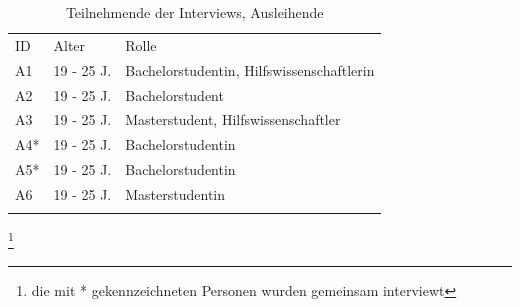 \begin{table}[h]
        \centering
        \caption{Teilnehmende der Interviews, Ausleihende}
        \begin{tabular}{lll}
                \arrayrulecolor{maincolor}\hline
                \sffamily\color{maincolor}ID & \sffamily\color{maincolor}Alter &
                \sffamily\color{maincolor}Rolle
                \\
                \arrayrulecolor{maincolor}\hline
                A1                           & 19 - 25 J.                      &
                Bachelorstudentin, Hilfswissenschaftlerin
                \\
                A2                           & 19 - 25 J.                      &
                Bachelorstudent                                                  \\
                A3                           & 19 - 25 J.                      &
                Masterstudent, Hilfswissenschaftler
                \\
                A4*                          & 19 - 25 J.                      &
                Bachelorstudentin                                                \\
                A5*                          & 19 - 25 J.                      &
                Bachelorstudentin                                                \\
                A6                           & 19 - 25 J.                      &
                Masterstudentin                                                  \\
                \arrayrulecolor{maincolor}\hline
        \end{tabular}
        \label{table:a}
\end{table}
\begin{center}
        \footnote{die mit * gekennzeichneten Personen wurden gemeinsam interviewt}
\end{center}

